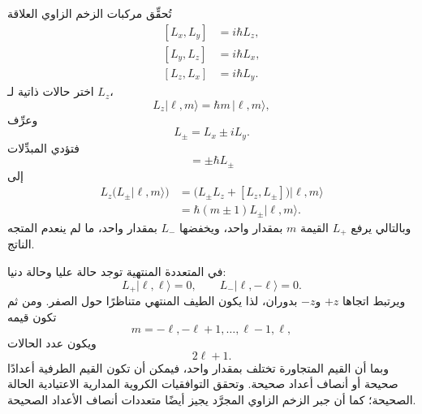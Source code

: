 تُحقِّق مركبات الزخم الزاوي العلاقة \begin{equation}
\begin{aligned}
[L_x,L_y]&=i\hbar L_z,\\
[L_y,L_z]&=i\hbar L_x,\\
[L_z,L_x]&=i\hbar L_y.
\end{aligned}
\end{equation} اختر حالات ذاتية لـ \(L_z\)، \begin{equation}
L_z|\ell,m\rangle=\hbar m\,|\ell,m\rangle,
\end{equation} وعرِّف \begin{equation}
L_\pm=L_x\pm iL_y.
\end{equation} فتؤدي المبدِّلات \begin{equation}
[L_z,L_\pm]=\pm\hbar L_\pm
\end{equation} إلى \begin{align}
L_z\bigl(L_\pm|\ell,m\rangle\bigr)
&=\bigl(L_\pm L_z+[L_z,L_\pm]\bigr)|\ell,m\rangle \\
&=\hbar(m\pm1)L_\pm|\ell,m\rangle.
\end{align} وبالتالي يرفع \(L_+\) القيمة \(m\) بمقدار واحد، ويخفضها \(L_-\) بمقدار واحد، ما لم ينعدم المتجه الناتج.

في المتعددة المنتهية توجد حالة عليا وحالة دنيا: \begin{equation}
L_+|\ell,\ell\rangle=0,
\qquad
L_-|\ell,-\ell\rangle=0.
\end{equation} ويرتبط اتجاها \(+z\) و\(-z\) بدوران، لذا يكون الطيف المنتهي متناظرًا حول الصفر. ومن ثم تكون قيمه \begin{equation}
m=-\ell,-\ell+1,\ldots,\ell-1,\ell,
\end{equation} ويكون عدد الحالات \begin{equation}
2\ell+1.
\end{equation} وبما أن القيم المتجاورة تختلف بمقدار واحد، فيمكن أن تكون القيم الطرفية أعدادًا صحيحة أو أنصاف أعداد صحيحة. وتحقق التوافقيات الكروية المدارية الاعتيادية الحالة الصحيحة؛ كما أن جبر الزخم الزاوي المجرَّد يجيز أيضًا متعددات أنصاف الأعداد الصحيحة.

\begin{classroomqa}\end{classroomqa}

